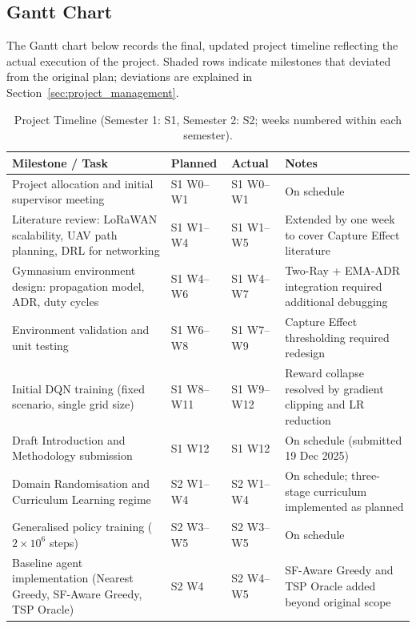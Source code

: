 \clearpage
\subsection{Gantt Chart}
\label{app:gantt}
\label{fig:gantt}

The Gantt chart below records the final, updated project timeline
reflecting the actual execution of the project. Shaded rows indicate
milestones that deviated from the original plan; deviations are
explained in Section~\ref{sec:project_management}.

\begin{table}[htbp]
\centering
\small
\caption{Project Timeline (Semester 1: S1, Semester 2: S2; weeks numbered within each semester).}
\label{tab:gantt}
\begin{tabularx}{\textwidth}{p{5.2cm} p{1.9cm} p{1.9cm} X}
\toprule
\textbf{Milestone / Task} & \textbf{Planned} & \textbf{Actual} & \textbf{Notes} \\
\midrule
Project allocation and initial supervisor meeting & S1 W0--W1 & S1 W0--W1 & On schedule \\
\midrule
Literature review: LoRaWAN scalability, UAV path planning, DRL for networking & S1 W1--W4 & S1 W1--W5 & Extended by one week to cover Capture Effect literature \\
\midrule
Gymnasium environment design: propagation model, ADR, duty cycles & S1 W4--W6 & S1 W4--W7 & Two-Ray + EMA-ADR integration required additional debugging \\
\midrule
Environment validation and unit testing & S1 W6--W8 & S1 W7--W9 & Capture Effect thresholding required redesign \\
\midrule
Initial DQN training (fixed scenario, single grid size) & S1 W8--W11 & S1 W9--W12 & Reward collapse resolved by gradient clipping and LR reduction \\
\midrule
Draft Introduction and Methodology submission & S1 W12 & S1 W12 & On schedule (submitted 19 Dec 2025) \\
\midrule
Domain Randomisation and Curriculum Learning regime & S2 W1--W4 & S2 W1--W4 & On schedule; three-stage curriculum implemented as planned \\
\midrule
Generalised policy training ($2 \times 10^6$ steps) & S2 W3--W5 & S2 W3--W5 & On schedule \\
\midrule
Baseline agent implementation (Nearest Greedy, SF-Aware Greedy, TSP Oracle) & S2 W4 & S2 W4--W5 & SF-Aware Greedy and TSP Oracle added beyond original scope \\

\end{tabularx}
\end{table}
